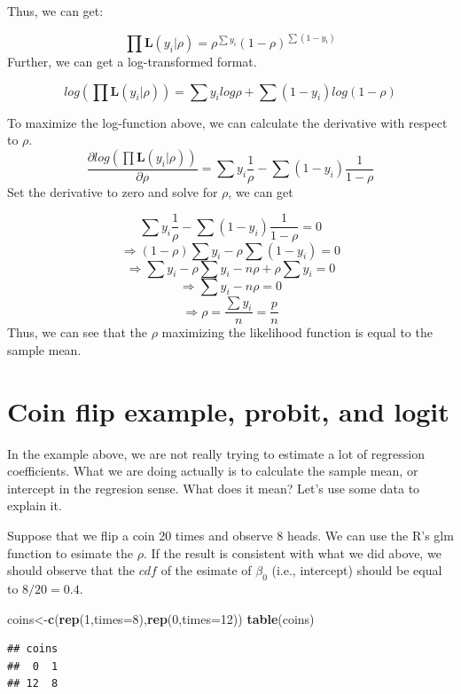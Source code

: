 \documentclass[]{book}
\newenvironment{Shaded}{\begin{snugshade}}{\end{snugshade}}
\newcommand{\DataTypeTok}[1]{\textcolor[rgb]{0.13,0.29,0.53}{#1}}
\newcommand{\DecValTok}[1]{\textcolor[rgb]{0.00,0.00,0.81}{#1}}
\newcommand{\KeywordTok}[1]{\textcolor[rgb]{0.13,0.29,0.53}{\textbf{#1}}}
\newcommand{\NormalTok}[1]{#1}
\begin{document}
Thus, we can get:

\[\prod \mathbf{L}(y_i|\rho)=\rho^{\sum y_i}(1-\rho)^{\sum(1-y_i)}\]
Further, we can get a log-transformed format.

\[log (\prod \mathbf{L}(y_i|\rho))=\sum y_i log \rho + \sum(1-y_i) log(1-\rho)\]

To maximize the log-function above, we can calculate the derivative with respect to \(\rho\).
\[\frac{\partial log (\prod \mathbf{L}(y_i|\rho)) }{\partial \rho}=\sum y_i \frac{1}{\rho}-\sum(1-y_i) \frac{1}{1-\rho}\]
Set the derivative to zero and solve for \(\rho\), we can get

\[\sum y_i \frac{1}{\rho}-\sum(1-y_i) \frac{1}{1-\rho}=0\]
\[\Rightarrow (1-\rho)\sum y_i - \rho \sum(1-y_i) =0\]
\[\Rightarrow \sum y_i-\rho\sum y_i - n\rho +\rho\sum y_i =0\]
\[\Rightarrow \sum y_i - n\rho  =0\]
\[\Rightarrow \rho  = \frac{\sum y_i}{n}=\frac{p}{n}\]
Thus, we can see that the \(\rho\) maximizing the likelihood function is equal to the sample mean.

\hypertarget{coin-flip-example-probit-and-logit}{%
\section{Coin flip example, probit, and logit}\label{coin-flip-example-probit-and-logit}}

In the example above, we are not really trying to estimate a lot of regression coefficients. What we are doing actually is to calculate the sample mean, or intercept in the regresion sense. What does it mean? Let's use some data to explain it.

Suppose that we flip a coin 20 times and observe 8 heads. We can use the R's glm function to esimate the \(\rho\). If the result is consistent with what we did above, we should observe that the \(cdf\) of the esimate of \(\beta_0\) (i.e., intercept) should be equal to \(8/20=0.4\).

\begin{Shaded}
\begin{Highlighting}[]
\NormalTok{coins<-}\KeywordTok{c}\NormalTok{(}\KeywordTok{rep}\NormalTok{(}\DecValTok{1}\NormalTok{,}\DataTypeTok{times=}\DecValTok{8}\NormalTok{),}\KeywordTok{rep}\NormalTok{(}\DecValTok{0}\NormalTok{,}\DataTypeTok{times=}\DecValTok{12}\NormalTok{))}
\KeywordTok{table}\NormalTok{(coins)}
\end{Highlighting}
\end{Shaded}

\begin{verbatim}
## coins
##  0  1 
## 12  8
\end{verbatim}
\end{document}
